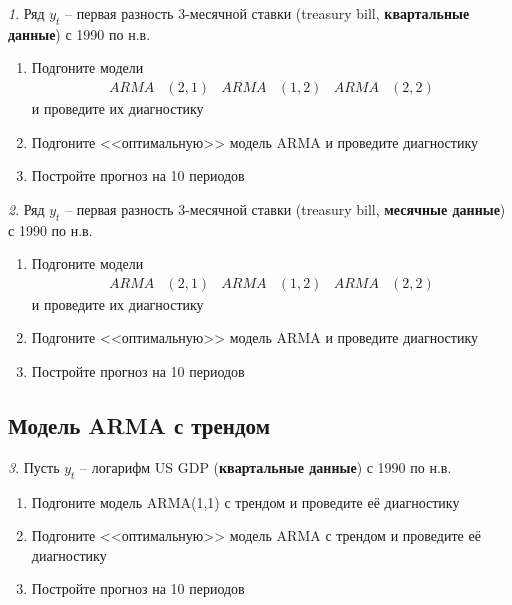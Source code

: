 \documentclass[12pt]{article}
\theoremstyle{remark}
\newtheorem{exercise}{}[subsection]
\begin{document}
\begin{exercise}
Ряд \(y_t\) -- первая разность 3-месячной ставки (treasury bill, 
\textbf{квартальные данные}) с 1990 по н.в.
\begin{enumerate}
	\item Подгоните модели
	\begin{align*}
		ARMA&(2,1) & ARMA&(1,2) & ARMA&(2,2)
	\end{align*} 
	и проведите их диагностику
	\item Подгоните <<оптимальную>> модель ARMA и проведите диагностику
	\item Постройте прогноз на 10 периодов
\end{enumerate}
\end{exercise}

\begin{exercise}
Ряд \(y_t\) -- первая разность 3-месячной ставки (treasury bill, 
\textbf{месячные данные}) с 1990 по н.в.
\begin{enumerate}
	\item Подгоните модели
	\begin{align*}
		ARMA&(2,1) & ARMA&(1,2) & ARMA&(2,2)
	\end{align*} 
	и проведите их диагностику
	\item Подгоните <<оптимальную>> модель ARMA и проведите диагностику
	\item Постройте прогноз на 10 периодов
\end{enumerate}
\end{exercise}

\subsection{Модель ARMA с трендом}

\begin{exercise}
Пусть \(y_t\) -- логарифм US GDP (\textbf{квартальные данные}) с 1990 по н.в.
\begin{enumerate}
	\item Подгоните модель ARMA(1,1) с трендом и проведите её диагностику
	\item Подгоните <<оптимальную>> модель ARMA с трендом и проведите её диагностику
	\item Постройте прогноз на 10 периодов
\end{enumerate}
\end{exercise}
\end{document}
